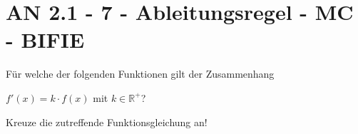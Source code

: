 \section{AN 2.1 - 7 - Ableitungsregel - MC - BIFIE}

\begin{beispiel}[AN 2.1]{1} %
				Für welche der folgenden Funktionen gilt der Zusammenhang 

$f'(x)=k\cdot f(x)$ mit $k\in\mathbb{R^+}$?
\leer

Kreuze die zutreffende Funktionsgleichung an!
\end{beispiel}